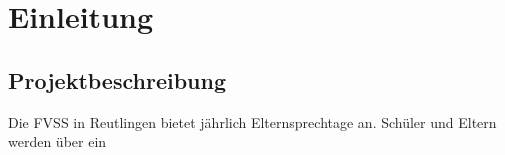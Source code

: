 \section{Einleitung}
\label{sec:Einleitung}

\subsection{Projektbeschreibung}
\label{sec:Projektbeschreibung}
	Die \ac{FVSS} in Reutlingen bietet jährlich Elternsprechtage an. Schüler und Eltern werden über ein 